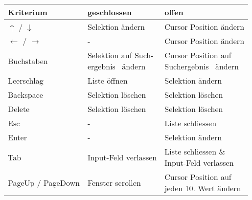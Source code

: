 \begin{table}[!htb] 
    \label{table:interactionNewComponent}
    \footnotesize
    \begin{adjustbox}{max width=0.95\textwidth}
        \begin{threeparttable}
            \begin{tabular}{ l || l | l }
                \bf{Kriterium}    & \bf{geschlossen} & \bf{offen} \\
                \hline \hline
                $\uparrow$ / $\downarrow$    & Selektion ändern & Cursor Position ändern                 \\
                \hline
                $\leftarrow$ / $\rightarrow$ & -                & Cursor Position ändern                 \\
                \hline
                Buchstaben  & \tbbr{Selektion auf Such-\\ 
                                    ergebnis\tnote{1} \ ändern} & \tbbr{Cursor Position auf \\ 
                                                                        Suchergebnis\tnote{1} \ ändern}  \\
                \hline
                Leerschlag  & Liste öffnen                & Selektion ändern  \\
                \hline
                Backspace   & Selektion löschen           & Selektion löschen \\
                \hline
                Delete      & Selektion löschen           & Selektion löschen \\
                \hline
                Esc         & -                           & Liste schliessen  \\
                \hline \hline
                Enter       & -                           & Selektion ändern  \\
                \hline
                Tab         & Input-Feld verlassen        & \tbbr{Liste schliessen \& \\ 
                                                                  Input-Feld verlassen}                  \\
                \hline
                PageUp / PageDown & Fenster scrollen      & \tbbr{Cursor Position auf \\ 
                                                                  jeden 10. Wert ändern}                 \\

\end{tabular}
\end{threeparttable}
\end{adjustbox}
\end{table}
